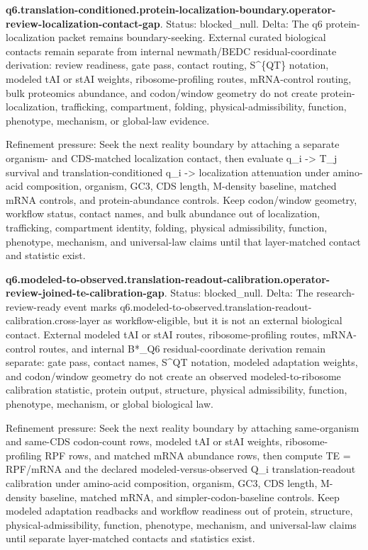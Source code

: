 \textbf{q6.translation-conditioned.protein-localization-boundary.operator-review-localization-contact-gap}. Status: blocked\_null. Delta: The q6 protein-localization packet remains boundary-seeking. External curated biological contacts remain separate from internal newmath/BEDC residual-coordinate derivation: review readiness, gate pass, contact routing, S\textasciicircum{}\{QT\} notation, modeled tAI or stAI weights, ribosome-profiling routes, mRNA-control routing, bulk proteomics abundance, and codon/window geometry do not create protein-localization, trafficking, compartment, folding, physical-admissibility, function, phenotype, mechanism, or global-law evidence.

Refinement pressure: Seek the next reality boundary by attaching a separate organism- and CDS-matched localization contact, then evaluate q\_i -> T\_j survival and translation-conditioned q\_i -> localization attenuation under amino-acid composition, organism, GC3, CDS length, M-density baseline, matched mRNA controls, and protein-abundance controls. Keep codon/window geometry, workflow status, contact names, and bulk abundance out of localization, trafficking, compartment identity, folding, physical admissibility, function, phenotype, mechanism, and universal-law claims until that layer-matched contact and statistic exist.

\textbf{q6.modeled-to-observed.translation-readout-calibration.operator-review-joined-te-calibration-gap}. Status: blocked\_null. Delta: The research-review-ready event marks q6.modeled-to-observed.translation-readout-calibration.cross-layer as workflow-eligible, but it is not an external biological contact. External modeled tAI or stAI routes, ribosome-profiling routes, mRNA-control routes, and internal B*\_Q6 residual-coordinate derivation remain separate: gate pass, contact names, S\textasciicircum{}QT notation, modeled adaptation weights, and codon/window geometry do not create an observed modeled-to-ribosome calibration statistic, protein output, structure, physical admissibility, function, phenotype, mechanism, or global biological law.

Refinement pressure: Seek the next reality boundary by attaching same-organism and same-CDS codon-count rows, modeled tAI or stAI weights, ribosome-profiling RPF rows, and matched mRNA abundance rows, then compute TE = RPF/mRNA and the declared modeled-versus-observed Q\_i translation-readout calibration under amino-acid composition, organism, GC3, CDS length, M-density baseline, matched mRNA, and simpler-codon-baseline controls. Keep modeled adaptation readbacks and workflow readiness out of protein, structure, physical-admissibility, function, phenotype, mechanism, and universal-law claims until separate layer-matched contacts and statistics exist.


